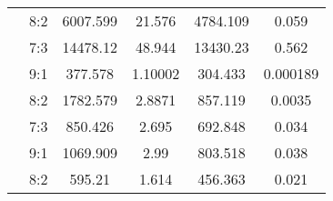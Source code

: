 \documentclass{ieeeojies}
\begin{document}
\begin{table}[H]
\begin{tabular}{|c|c|c|c|c|c|}
\cellcolor[HTML]{FBC193}{\color[HTML]{000000} }                                                                                         & {\color[HTML]{000000} 8:2}            & {\color[HTML]{000000} 6007.599}      & {\color[HTML]{000000} 21.576}        & {\color[HTML]{000000} 4784.109}     & {\color[HTML]{000000} 0.059}         \\ \cline{2-6} 
\rowcolor[HTML]{FBC193} 
\multirow{-3}{*}{\cellcolor[HTML]{FBC193}{\color[HTML]{000000} \textbf{ARIMA}}}                                                         & {\color[HTML]{000000} 7:3}            & {\color[HTML]{000000} 14478.12}      & {\color[HTML]{000000} 48.944}        & {\color[HTML]{000000} 13430.23}     & {\color[HTML]{000000} 0.562}         \\ \hline
\rowcolor[HTML]{FFB6AF} 
\cellcolor[HTML]{FFB6AF}{\color[HTML]{000000} }                                                                                         & {\color[HTML]{FE0000} 9:1}            & {\color[HTML]{FE0000} 377.578}       & {\color[HTML]{FE0000} 1.10002}       & {\color[HTML]{FE0000} 304.433}      & {\color[HTML]{FE0000} 0.000189}      \\ \cline{2-6} 
\rowcolor[HTML]{FFB6AF} 
\cellcolor[HTML]{FFB6AF}{\color[HTML]{000000} }                                                                                         & {\color[HTML]{000000} 8:2}            & {\color[HTML]{000000} 1782.579}      & {\color[HTML]{000000} 2.8871}        & {\color[HTML]{000000} 857.119}      & {\color[HTML]{000000} 0.0035}        \\ \cline{2-6} 
\rowcolor[HTML]{FFB6AF} 
\multirow{-3}{*}{\cellcolor[HTML]{FFB6AF}{\color[HTML]{000000} \textbf{SVR}}}                                                           & {\color[HTML]{000000} 7:3}            & {\color[HTML]{000000} 850.426}       & {\color[HTML]{000000} 2.695}         & {\color[HTML]{000000} 692.848}      & {\color[HTML]{000000} 0.034}         \\ \hline
\rowcolor[HTML]{FBC193} 
\cellcolor[HTML]{FBC193}{\color[HTML]{000000} }                                                                                         & {\color[HTML]{000000} 9:1}            & {\color[HTML]{000000} 1069.909}      & {\color[HTML]{000000} 2.99}          & {\color[HTML]{000000} 803.518}      & {\color[HTML]{000000} 0.038}         \\ \cline{2-6} 
\rowcolor[HTML]{FBC193} 
\cellcolor[HTML]{FBC193}{\color[HTML]{000000} }                                                                                         & {\color[HTML]{FE0000} 8:2}            & {\color[HTML]{FE0000} 595.21}        & {\color[HTML]{FE0000} 1.614}         & {\color[HTML]{FE0000} 456.363}      & {\color[HTML]{FE0000} 0.021}         \\ \cline{2-6} 

\end{tabular}
\end{table}
\end{document}
